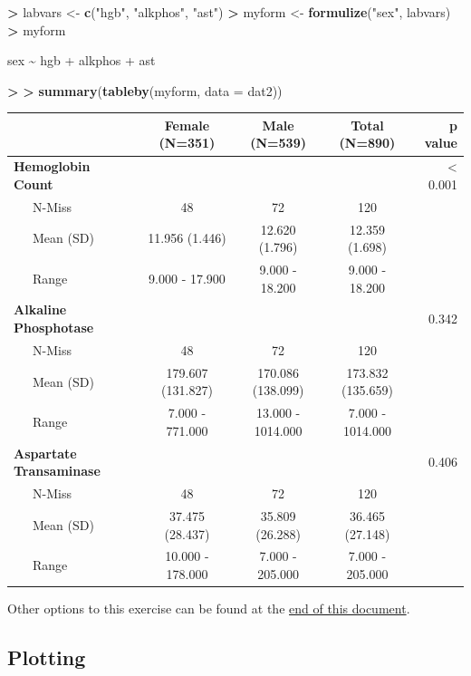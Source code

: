 \documentclass[
]{book}
\newenvironment{Shaded}{\begin{snugshade}}{\end{snugshade}}
\newcommand{\DataTypeTok}[1]{\textcolor[rgb]{0.13,0.29,0.53}{#1}}
\newcommand{\ErrorTok}[1]{\textcolor[rgb]{0.64,0.00,0.00}{\textbf{#1}}}
\newcommand{\KeywordTok}[1]{\textcolor[rgb]{0.13,0.29,0.53}{\textbf{#1}}}
\newcommand{\NormalTok}[1]{#1}
\newcommand{\OperatorTok}[1]{\textcolor[rgb]{0.81,0.36,0.00}{\textbf{#1}}}
\newcommand{\StringTok}[1]{\textcolor[rgb]{0.31,0.60,0.02}{#1}}
\begin{document}
\begin{Shaded}
\begin{Highlighting}[]
\OperatorTok{>}\StringTok{ }\NormalTok{labvars <-}\StringTok{ }\KeywordTok{c}\NormalTok{(}\StringTok{"hgb"}\NormalTok{, }\StringTok{"alkphos"}\NormalTok{, }\StringTok{"ast"}\NormalTok{)}
\OperatorTok{>}\StringTok{ }\NormalTok{myform <-}\StringTok{ }\KeywordTok{formulize}\NormalTok{(}\StringTok{"sex"}\NormalTok{, labvars)}
\OperatorTok{>}\StringTok{ }\NormalTok{myform}
\end{Highlighting}
\end{Shaded}

sex \textasciitilde{} hgb + alkphos + ast

\begin{Shaded}
\begin{Highlighting}[]
\OperatorTok{>}\StringTok{ }
\ErrorTok{>}\StringTok{ }\KeywordTok{summary}\NormalTok{(}\KeywordTok{tableby}\NormalTok{(myform, }\DataTypeTok{data =}\NormalTok{ dat2))}
\end{Highlighting}
\end{Shaded}

\begin{longtable}[]{@{}lcccr@{}}
\toprule
& Female (N=351) & Male (N=539) & Total (N=890) & p value\tabularnewline
\midrule
\endhead
\textbf{Hemoglobin Count} & & & & \textless{} 0.001\tabularnewline
~~~N-Miss & 48 & 72 & 120 &\tabularnewline
~~~Mean (SD) & 11.956 (1.446) & 12.620 (1.796) & 12.359 (1.698) &\tabularnewline
~~~Range & 9.000 - 17.900 & 9.000 - 18.200 & 9.000 - 18.200 &\tabularnewline
\textbf{Alkaline Phosphotase} & & & & 0.342\tabularnewline
~~~N-Miss & 48 & 72 & 120 &\tabularnewline
~~~Mean (SD) & 179.607 (131.827) & 170.086 (138.099) & 173.832 (135.659) &\tabularnewline
~~~Range & 7.000 - 771.000 & 13.000 - 1014.000 & 7.000 - 1014.000 &\tabularnewline
\textbf{Aspartate Transaminase} & & & & 0.406\tabularnewline
~~~N-Miss & 48 & 72 & 120 &\tabularnewline
~~~Mean (SD) & 37.475 (28.437) & 35.809 (26.288) & 36.465 (27.148) &\tabularnewline
~~~Range & 10.000 - 178.000 & 7.000 - 205.000 & 7.000 - 205.000 &\tabularnewline
\bottomrule
\end{longtable}

Other options to this exercise can be found at the \protect\hyperlink{alt-import}{end of this document}.

\hypertarget{plotting}{%
\subsection{Plotting}\label{plotting}}
\end{document}
